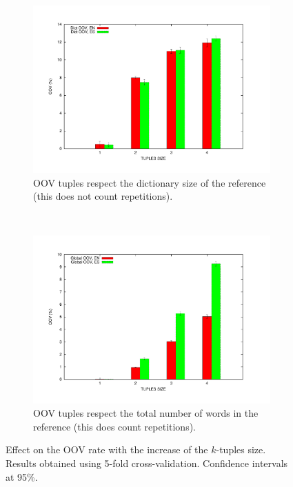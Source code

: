 \documentclass[10pt,a4paper]{article}
\begin{document}
\begin{figure}[h]
\centering
\begin{subfigure}[b]{0.485\textwidth}
\centering
\includegraphics[width=\textwidth]{OOV_dict.pdf}
\caption{OOV tuples respect the dictionary size of the reference (this does not count repetitions).}
\label{fig:oov_dict}
\end{subfigure}
~
\begin{subfigure}[b]{0.485\textwidth}
\centering
\includegraphics[width=\textwidth]{OOV_global.pdf}
\caption{OOV tuples respect the total number of words in the reference (this does count repetitions).}
\label{fig:oov_global}
\end{subfigure}
\caption{Effect on the OOV rate with the increase of the $k$-tuples size. Results obtained using 5-fold cross-validation. Confidence intervals at 95\%.}
\label{fig:oov}
\end{figure}
\end{document}
